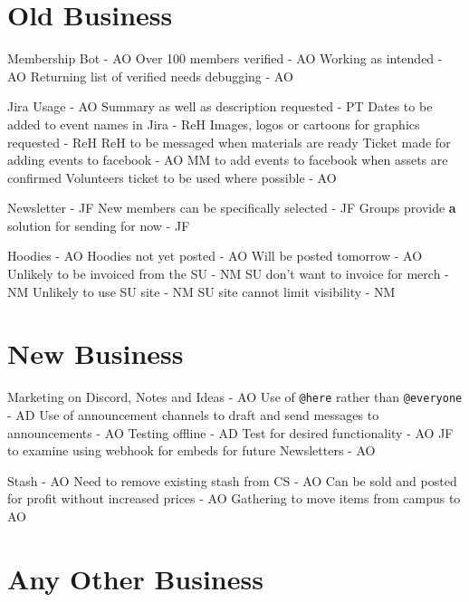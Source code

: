 \documentclass[11pt,hacksoc]{meetingmins}
\begin{document}
\section{Old Business}
\begin{items}
\item Membership Bot - AO
  \subitem Over 100 members verified - AO
  \subitem Working as intended - AO
  \subitem Returning list of verified needs debugging - AO
\item Jira Usage - AO
  \subitem Summary as well as description requested - PT
  \subitem Dates to be added to event names in Jira - ReH
  \subitem Images, logos or cartoons for graphics requested - ReH
    \subsubitem ReH to be messaged when materials are ready
  \subitem Ticket made for adding events to facebook - AO
    \subsubitem MM to add events to facebook when assets are confirmed
  \subitem Volunteers ticket to be used where possible - AO
\item Newsletter - JF
  \subitem New members can be specifically selected - JF
  \subitem Groups provide \textbf{a} solution for sending for now - JF 
\item Hoodies - AO
  \subitem Hoodies not yet posted - AO
    \subsubitem Will be posted tomorrow - AO
  \subitem Unlikely to be invoiced from the SU - NM
    \subsubitem SU don't want to invoice for merch - NM
  \subitem Unlikely to use SU site - NM
    \subsubitem SU site cannot limit visibility - NM
\end{items}

\section{New Business}
\begin{items}
\item Marketing on Discord, Notes and Ideas - AO
  \subitem Use of \verb|@here| rather than \verb|@everyone| - AD
  \subitem Use of announcement channels to draft and send messages to announcements - AO
  \subitem Testing offline - AD
  \subitem Test for desired functionality - AO
  \subitem JF to examine using webhook for embeds for future Newsletters - AO
\item Stash - AO
  \subitem Need to remove existing stash from CS - AO
  \subitem Can be sold and posted for profit without increased prices - AO
  \subitem Gathering to move items from campus to AO 
\end{items}

\section{Any Other Business}

\vspace{1em}
\end{document}
